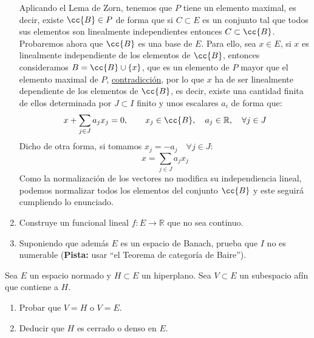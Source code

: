 \begin{ejercicio}
\begin{enumerate}[label=\alph*)]
            Aplicando el Lema de Zorn, tenemos que $P$ tiene un elemento maximal, es decir, existe $\cc{B}\in P$ de forma que si $C\subset E$ es un conjunto tal que todos sus elementos son linealmente independientes entonces $C\subset \cc{B}$. Probaremos ahora que $\cc{B}$ es una base de $E$. Para ello, sea $x\in E$, si $x$ es linealmente independiente de los elementos de $\cc{B}$, entonces consideramos $B = \cc{B}\cup \{x\}$, que es un elemento de $P$ mayor que el elemento maximal de $P$, \underline{contradicción}, por lo que $x$ ha de ser linealmente dependiente de los elementos de $\cc{B}$, es decir, existe una cantidad finita de ellos determinada por $J\subset I$ finito y unos escalares $a_i$ de forma que:
            \begin{equation*}
                x + \sum_{j\in J}a_j x_j = 0, \qquad x_j \in \cc{B}, \quad a_j\in \mathbb{R}, \quad \forall j\in J
            \end{equation*}
            Dicho de otra forma, si tomamos $x_j = -a_j \quad \forall j\in J$:
            \begin{equation*}
                x = \sum_{j\in J} a_jx_j
            \end{equation*}
            Como la normalización de los vectores no modifica su independiencia lineal, podemos normalizar todos los elementos del conjunto $\cc{B}$ y este seguirá cumpliendo lo enunciado.

        \item Construye un funcional lineal $f:E\to \mathbb{R}$ que no sea continuo. %
        \item Suponiendo que además $E$ es un espacio de Banach, prueba que $I$ no es numerable (\textbf{Pista:} usar ``el Teorema de categoría de Baire'').
    \end{enumerate}
\end{ejercicio}

\begin{ejercicio} %
    Sea $E$ un espacio normado y $H\subset E$ un hiperplano. Sea $V\subset E$ un subespacio afín que contiene a $H$.
    \begin{enumerate}[label=\alph*)]
        \item Probar que $V=H$ o $V=E$.
        \item Deducir que $H$ es cerrado o denso en $E$.
    \end{enumerate}
\end{ejercicio}

